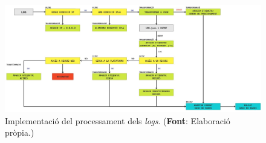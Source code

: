 \noindent \\
\begin{figure}[htbp]
    \centerline{\includegraphics[width=1.3\textwidth]{figures/log-processing-workflow}}
    \captionsetup{justification=centering}
    \caption{Implementació del processament dels \textit{logs}. (\textbf{Font}: Elaboració pròpia.)}\label{fig:log-processing-workflow}
\end{figure}